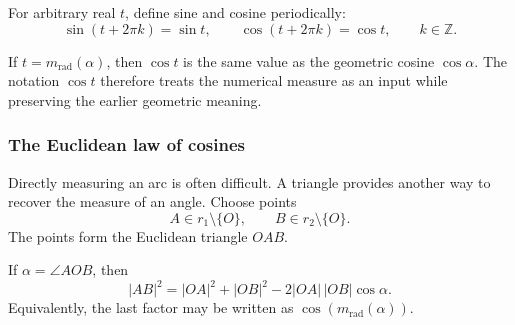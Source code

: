 \begin{definitionbox}
For arbitrary real $t$, define sine and cosine periodically:
\[
\boxed{
\sin(t+2\pi k)=\sin t,
\qquad
\cos(t+2\pi k)=\cos t,
\qquad k\in\mathbb Z
}.
\]
\end{definitionbox}

\begin{interpretationbox}
If $t=m_{\mathrm{rad}}(\alpha)$, then $\cos t$ is the same value as the
geometric cosine $\cos\alpha$. The notation $\cos t$ therefore treats the
numerical measure as an input while preserving the earlier geometric meaning.
\end{interpretationbox}

\subsubsection*{The Euclidean law of cosines}

Directly measuring an arc is often difficult. A triangle provides another way
to recover the measure of an angle. Choose points
\[
A\in r_1\setminus\{O\},
\qquad
B\in r_2\setminus\{O\}.
\]
The points form the Euclidean triangle $OAB$.

\begin{center}
\end{center}

\begin{theorembox}
If $\alpha=\angle AOB$, then
\[
\boxed{
|AB|^2=|OA|^2+|OB|^2-2|OA|\,|OB|\cos\alpha
}.
\]
Equivalently, the last factor may be written as
$\cos(m_{\mathrm{rad}}(\alpha))$.
\end{theorembox}

